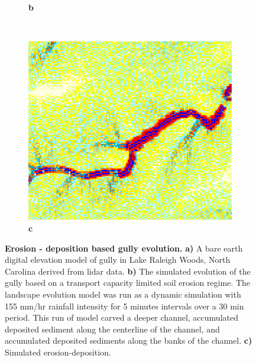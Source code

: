 \documentclass[final,3p,times,twocolumn]{elsarticle}
\begin{document}
\begin{figure}
\begin{subfigure}[b]{0.3\textwidth}
\label{fig_2_2}
\textbf{b} \\
\end{subfigure}
%
~ %
%
\begin{subfigure}[b]{0.3\textwidth}
\includegraphics[width=\textwidth]{images/lrwoods_dynamics_erdep_5m_30m_erdep.png} %
\label{fig_2_3}
\textbf{c} \\
\end{subfigure}
%
\caption{{\bf Erosion - deposition based gully evolution.}
\textbf{a)}
A bare earth digital elevation model of gully in Lake Raleigh Woods, North Carolina derived from lidar data.
\textbf{b)}
The simulated evolution of the gully based on a transport capacity limited  soil erosion regime.
The landscape evolution model was run as a dynamic simulation with 155 mm/hr rainfall intensity for 5 minutes intervals over a 30 min period.
This run of model carved a deeper channel, accumulated deposited sediment along the centerline of the channel, and accumulated deposited sediments along the banks of the channel.
\textbf{c)}
Simulated erosion-deposition. 
}
\label{fig_1}
\end{figure}
\end{document}
